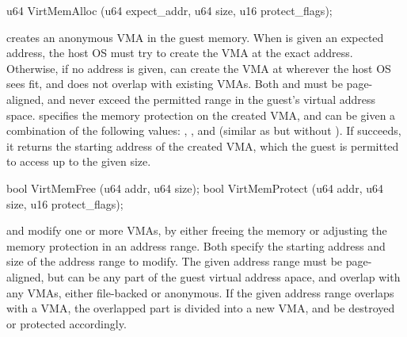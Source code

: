 \begin{paldef}
u64  VirtMemAlloc   (u64 expect_addr, u64 size,
                     u16 protect_flags);
\end{paldef}


 creates an anonymous VMA in the guest memory. When  is given an expected address, the host OS must try to create the VMA at the exact address.
Otherwise, if no address is given,  can create the VMA at wherever the host OS sees fit, and does not overlap with existing VMAs.
Both  and 
must be page-aligned, and never exceed the permitted range in the guest's virtual address space.
 specifies the memory protection on the created VMA, and can be given a combination of the following values: , , and  (similar as  but without ).
If  succeeds, it returns the starting address
of the created VMA, which the guest is permitted to access up to the given size.





\begin{paldef}
bool VirtMemFree    (u64 addr, u64 size);
bool VirtMemProtect (u64 addr, u64 size,
                     u16 protect_flags);
\end{paldef}


 and  modify one or more VMAs, 
by either freeing the memory
or adjusting the memory protection in an address range.
Both \hostapis{} specify the starting address and size of the address range to modify.
The given address range must be page-aligned,
but can be any part of the guest virtual address apace,
and overlap with any VMAs, either file-backed or anonymous.
If the given address range overlaps with a VMA, the overlapped part is divided into a new VMA, and be destroyed or protected accordingly.


 






